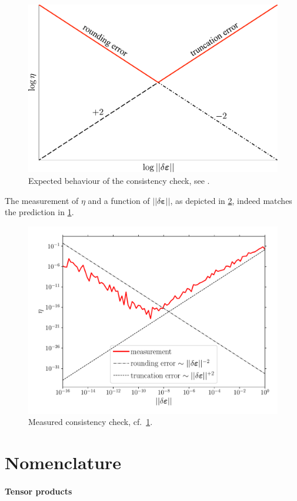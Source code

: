 \documentclass[namecite, fleqn]{goose-article}
\begin{document}
\begin{figure}[htp]
    \centering
    \includegraphics[width=.5\textwidth]{figures/consistency}
    \caption{Expected behaviour of the consistency check, see \citet[p.~9]{Heath2002}.}
    \label{fig:consistency:expected}
\end{figure}

The measurement of $\eta$ and a function of $|| \delta \bm{\varepsilon} ||$, as depicted in
\cref{fig:consistency}, indeed matches the prediction in \cref{fig:consistency:expected}.

\begin{figure}[htp]
    \centering
    \includegraphics[width=.5\textwidth]{examples/consistency}
    \caption{Measured consistency check, cf.\ \cref{fig:consistency:expected}.}
    \label{fig:consistency}
\end{figure}



\appendix
\vfill\newpage

\section{Nomenclature}
\label{sec:ap:nomenclature}

\paragraph{Tensor products}
\vspace*{.5eM}
\end{document}
